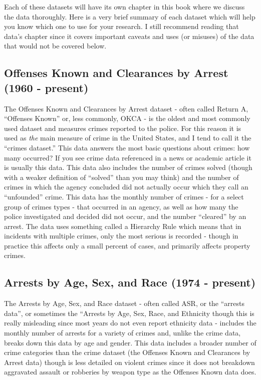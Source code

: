 \documentclass[
]{krantz}
\begin{document}
Each of these datasets will have its own chapter in this
book where we discuss the data thoroughly. Here is a very
brief summary of each dataset which will help you know which
one to use for your research. I still recommend reading that
data's chapter since it covers important caveats and uses
(or misuses) of the data that would not be covered below.

\subsection{Offenses Known and Clearances by Arrest (1960 -
present)}\label{offenses-known-and-clearances-by-arrest-1960---present}

The Offenses Known and Clearances by Arrest dataset - often
called Return A, ``Offenses Known'' or, less commonly, OKCA
- is the oldest and most commonly used dataset and measures
crimes reported to the police. For this reason it is used as
\emph{the} main measure of crime in the United States, and I
tend to call it the ``crimes dataset.'' This data answers
the most basic questions about crimes: how many occurred? If
you see crime data referenced in a news or academic article
it is usually this data. This data also includes the number
of crimes solved (though with a weaker definition of
``solved'' than you may think) and the number of crimes in
which the agency concluded did not actually occur which they
call an ``unfounded'' crime. This data has the monthly
number of crimes - for a select group of crimes types - that
occurred in an agency, as well as how many the police
investigated and decided did not occur, and the number
``cleared'' by an arrest. The data uses something called a
Hierarchy Rule which means that in incidents with multiple
crimes, only the most serious is recorded - though in
practice this affects only a small percent of cases, and
primarily affects property crimes.

\subsection{Arrests by Age, Sex, and Race (1974 -
present)}\label{arrests-by-age-sex-and-race-1974---present}

The Arrests by Age, Sex, and Race dataset - often called
ASR, or the ``arrests data'', or sometimes the ``Arrests by
Age, Sex, Race, and Ethnicity though this is really
misleading since most years do not even report ethnicity
data - includes the monthly number of arrests for a variety
of crimes and, unlike the crime data, breaks down this data
by age and gender. This data includes a broader number of
crime categories than the crime dataset (the Offenses Known
and Clearances by Arrest data) though is less detailed on
violent crimes since it does not breakdown aggravated
assault or robberies by weapon type as the Offenses Known
data does.
\end{document}
